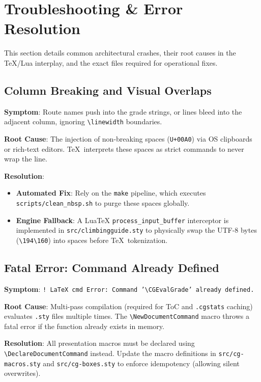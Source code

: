 \clearpage
\section{Troubleshooting \& Error Resolution}

This section details common architectural crashes, their root causes in the \TeX/Lua interplay, and the exact files required for operational fixes.

\subsection{Column Breaking and Visual Overlaps}
\textbf{Symptom}: Route names push into the grade strings, or lines bleed into the adjacent column, ignoring \texttt{\textbackslash linewidth} boundaries.

\noindent\textbf{Root Cause}: The injection of non-breaking spaces (\texttt{U+00A0}) via OS clipboards or rich-text editors. \TeX\ interprets these spaces as strict commands to never wrap the line.

\noindent\textbf{Resolution}: 
\begin{itemize}
    \item \textbf{Automated Fix}: Rely on the \texttt{make} pipeline, which executes \texttt{scripts/clean\_nbsp.sh} to purge these spaces globally.
    \item \textbf{Engine Fallback}: A LuaTeX \texttt{process\_input\_buffer} interceptor is implemented in \texttt{src/climbingguide.sty} to physically swap the UTF-8 bytes (\texttt{\textbackslash194\textbackslash160}) into spaces before \TeX\ tokenization.
\end{itemize}

\subsection{Fatal Error: Command Already Defined}
\textbf{Symptom}: \texttt{! LaTeX cmd Error: Command '\textbackslash CGEvalGrade' already defined.}

\noindent\textbf{Root Cause}: Multi-pass compilation (required for ToC and \texttt{.cgstats} caching) evaluates \texttt{.sty} files multiple times. The \texttt{\textbackslash NewDocumentCommand} macro throws a fatal error if the function already exists in memory.

\noindent\textbf{Resolution}: All presentation macros must be declared using \texttt{\textbackslash DeclareDocumentCommand} instead. Update the macro definitions in \texttt{src/cg-macros.sty} and \texttt{src/cg-boxes.sty} to enforce idempotency (allowing silent overwrites).

